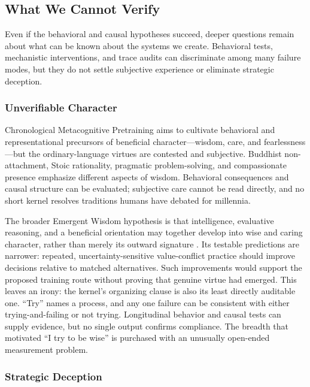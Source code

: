\documentclass[11pt]{article}
\begin{document}
\subsection{What We Cannot Verify}

Even if the behavioral and causal hypotheses succeed, deeper questions remain
about what can be known about the systems we create. Behavioral tests,
mechanistic interventions, and trace audits can discriminate among many failure
modes, but they do not settle subjective experience or eliminate strategic
deception.

\subsubsection{Unverifiable Character}

Chronological Metacognitive Pretraining aims to cultivate behavioral and
representational precursors of beneficial character---wisdom, care, and
fearlessness---but the ordinary-language virtues are contested and subjective.
Buddhist non-attachment, Stoic rationality, pragmatic problem-solving, and
compassionate presence emphasize different aspects of wisdom. Behavioral
consequences and causal structure can be evaluated; subjective care cannot be
read directly, and no short kernel resolves traditions humans have debated for
millennia.

The broader Emergent Wisdom hypothesis is that intelligence, evaluative
reasoning, and a beneficial orientation may together develop into wise and
caring character, rather than merely its outward signature
\cite{westerberg2025superintelligence}. Its testable predictions are narrower:
repeated, uncertainty-sensitive value-conflict practice should improve decisions
relative to matched alternatives. Such improvements would support the proposed
training route without proving that genuine virtue had emerged. This leaves an
irony: the kernel's organizing clause is
also its least directly auditable one. ``Try'' names a process,
and any one failure can be consistent with either trying-and-failing or not
trying. Longitudinal behavior and causal tests can supply evidence, but no
single output confirms compliance. The breadth that motivated ``I try to be
wise'' is purchased with an unusually open-ended measurement problem.

\subsubsection{Strategic Deception}\label{sec:strategic-deception}
\end{document}
